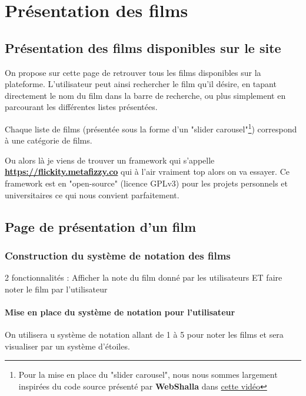 \chapter{Présentation des films} %


\section{Présentation des films disponibles sur le site} 

            On propose sur cette page de retrouver tous les films disponibles sur la plateforme. L'utilisateur peut ainsi rechercher le film qu'il désire, en tapant directement le nom du film dans la barre de recherche, ou plus simplement en parcourant les différentes listes présentées.

            Chaque liste de films (présentée sous la forme d'un "slider carousel"\footnote{Pour la mise en place du "slider carousel", nous nous sommes largement inspirées du code source présenté par {\bfseries WebShalla} dans \href{https://www.youtube.com/watch?v=Gi4CTYOs7J4}{cette vidéo} }) correspond à une catégorie de films.

            Ou alors là je viens de trouver un framework qui s'appelle {\bfseries \href{Flickity}{https://flickity.metafizzy.co} } qui à l'air vraiment top alors on va essayer. Ce framework est en "open-source" (licence GPLv3) pour les projets personnels et universitaires ce qui nous convient parfaitement.


        \section{Page de présentation d'un film}

            \subsection{Construction du système de notation des films}
                2 fonctionnalités : Afficher la note du film donné par les utilisateurs ET faire noter le film par l'utilisateur

                \subsubsection{Mise en place du système de notation pour l'utilisateur}

                    On utilisera u système de notation allant de 1 à 5 pour noter les films et sera visualiser par un système d'étoiles.


